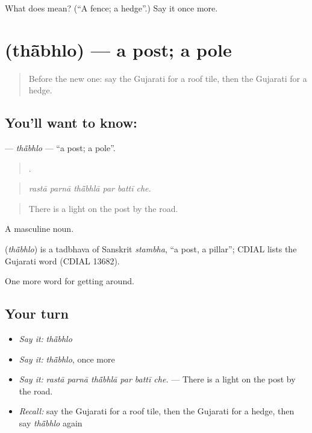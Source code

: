 \begin{tcolorbox}[breakable,colback=teal!4,colframe=teal!35!black,title={Before you move on}]
What does  mean? (\textquotedblleft{}A fence; a hedge\textquotedblright{}.) Say it once more.
\end{tcolorbox}
\section[\texorpdfstring{\gu{થાંભલો} (thā̃bhlo)}{થાંભલો (thā̃bhlo)}]{ (thā̃bhlo) — a post; a pole}

\label{lesson:GU-C420-thabhlo}



\begin{quote}
Before the new one: say the Gujarati for a roof tile, then the Gujarati for a hedge.
\end{quote}

\subsection*{You'll want to know: }
\textbf{} — \emph{thā̃bhlo} — \textquotedblleft{}a post; a pole\textquotedblright{}.

\begin{quote}
     .
\end{quote}

\begin{quote}
\emph{rastā parnā thā̃bhlā par battī che.}
\end{quote}

\begin{quote}
There is a light on the post by the road.
\end{quote}

A masculine noun.

\begin{cousinweb}
\textbf{} (\emph{thā̃bhlo}) is a tadbhava of Sanskrit \emph{stambha}, \textquotedblleft{}a post, a pillar\textquotedblright{}; CDIAL lists the Gujarati word (CDIAL 13682).
\end{cousinweb}

\begin{grammarlens}[title={What you've built}]
One more word for getting around.
\end{grammarlens}

\subsection*{Your turn}
\begin{itemize}
\raggedright
  \item \emph{Say it:} \emph{thā̃bhlo}
  \item \emph{Say it:} \emph{thā̃bhlo}, once more
  \item \emph{Say it:} \emph{rastā parnā thā̃bhlā par battī che.} — There is a light on the post by the road.
  \item \emph{Recall:} say the Gujarati for a roof tile, then the Gujarati for a hedge, then say \emph{thā̃bhlo} again
\end{itemize}


